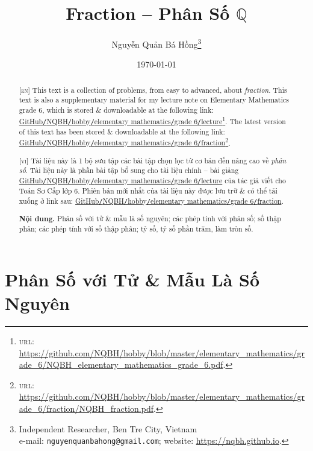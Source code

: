 \documentclass{article}
\title{Fraction -- Phân Số $\mathbb{Q}$}
\author{Nguyễn Quản Bá Hồng\footnote{Independent Researcher, Ben Tre City, Vietnam\\e-mail: \texttt{nguyenquanbahong@gmail.com}; website: \url{https://nqbh.github.io}.}}
\date{\today}
\begin{document}
\maketitle
\begin{abstract}
	\textsc{[en]} This text is a collection of problems, from easy to advanced, about \textit{fraction}. This text is also a supplementary material for my lecture note on Elementary Mathematics grade 6, which is stored \& downloadable at the following link: \href{https://github.com/NQBH/hobby/blob/master/elementary_mathematics/grade_6/NQBH_elementary_mathematics_grade_6.pdf}{GitHub\texttt{/}NQBH\texttt{/}hobby\texttt{/}elementary mathematics\texttt{/}grade 6\texttt{/}lecture}\footnote{\textsc{url}: \url{https://github.com/NQBH/hobby/blob/master/elementary_mathematics/grade_6/NQBH_elementary_mathematics_grade_6.pdf}.}. The latest version of this text has been stored \& downloadable at the following link: \href{https://github.com/NQBH/hobby/blob/master/elementary_mathematics/grade_6/fraction/NQBH_fraction.pdf}{GitHub\texttt{/}NQBH\texttt{/}hobby\texttt{/}elementary mathematics\texttt{/}grade 6\texttt{/}fraction}\footnote{\textsc{url}: \url{https://github.com/NQBH/hobby/blob/master/elementary_mathematics/grade_6/fraction/NQBH_fraction.pdf}.}.
	\vspace{2mm}
	
	\textsc{[vi]} Tài liệu này là 1 bộ sưu tập các bài tập chọn lọc từ cơ bản đến nâng cao về \textit{phân số}. Tài liệu này là phần bài tập bổ sung cho tài liệu chính -- bài giảng \href{https://github.com/NQBH/hobby/blob/master/elementary_mathematics/grade_6/NQBH_elementary_mathematics_grade_6.pdf}{GitHub\texttt{/}NQBH\texttt{/}hobby\texttt{/}elementary mathematics\texttt{/}grade 6\texttt{/}lecture} của tác giả viết cho Toán Sơ Cấp lớp 6. Phiên bản mới nhất của tài liệu này được lưu trữ \& có thể tải xuống ở link sau: \href{https://github.com/NQBH/hobby/blob/master/elementary_mathematics/grade_6/fraction/NQBH_fraction.pdf}{GitHub\texttt{/}NQBH\texttt{/}hobby\texttt{/}elementary mathematics\texttt{/}grade 6\texttt{/}fraction}.
	
	\textsf{\textbf{Nội dung.} Phân số với tử \& mẫu là số nguyên; các phép tính với phân số; số thập phân; các phép tính với số thập phân; tỷ số, tỷ số phần trăm, làm tròn số.}
\end{abstract}
\tableofcontents
\newpage


\section{Phân Số với Tử \& Mẫu Là Số Nguyên}
\end{document}

